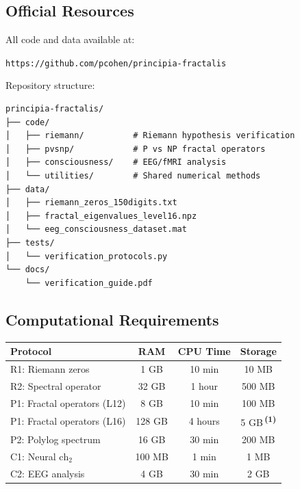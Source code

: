 \subsection{Official Resources}

All code and data available at:

\begin{center}
\texttt{https:/\allowbreak{}/\allowbreak{}github.\allowbreak{}com/\allowbreak{}pcohen/\allowbreak{}principia-fractalis}
\end{center}

Repository structure:
\begin{verbatim}
principia-fractalis/
├── code/
│   ├── riemann/          # Riemann hypothesis verification
│   ├── pvsnp/            # P vs NP fractal operators
│   ├── consciousness/    # EEG/fMRI analysis
│   └── utilities/        # Shared numerical methods
├── data/
│   ├── riemann_zeros_150digits.txt
│   ├── fractal_eigenvalues_level16.npz
│   └── eeg_consciousness_dataset.mat
├── tests/
│   └── verification_protocols.py
└── docs/
    └── verification_guide.pdf
\end{verbatim}

\subsection{Computational Requirements}

\begin{center}
\begin{tabular}{|l|c|c|c|}
\hline
\textbf{Protocol} & \textbf{RAM} & \textbf{CPU Time} & \textbf{Storage} \\
\hline
R1: Riemann zeros & 1 GB & 10 min & 10 MB \\
R2: Spectral operator & 32 GB & 1 hour & 500 MB \\
P1: Fractal operators (L12) & 8 GB & 10 min & 100 MB \\
P1: Fractal operators (L16) & 128 GB & 4 hours & 5 GB\,\textsuperscript{\textbf{(1)}} \\
P2: Polylog spectrum & 16 GB & 30 min & 200 MB \\
C1: Neural $\text{ch}_2$ & 100 MB & 1 min & 1 MB \\
C2: EEG analysis & 4 GB & 30 min & 2 GB \\
\hline
\end{tabular}
\end{center}

